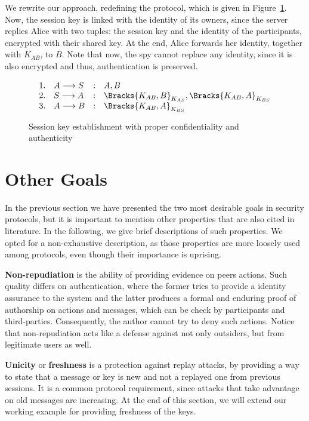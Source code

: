 We rewrite our approach, redefining the protocol, which is given in Figure~\ref{prt:session-key-auth}. Now, the session key is linked with the identity of its owners, since the server replies Alice with two tuples: the session key and the identity of the participants, encrypted with their shared key. At the end, Alice forwards her identity, together with $K_{AB}$, to $B$. Note that now, the spy cannot replace any identity, since it is also encrypted and thus, authentication is preserved.

\begin{figure}[ht]
  \centering
  \[
    \begin{array}{rlcl}
      1. & A \longrightarrow S &:& A, B \\
      2. & S \longrightarrow A &:& \Bracks{K_{AB}, B}_{K_{AS}}, \Bracks{K_{AB}, A}_{K_{BS}} \\
      3. & A \longrightarrow B &:& \Bracks{K_{AB}, A}_{K_{BS}} \\
    \end{array}
  \]
  \caption{Session key establishment with proper confidentiality and authenticity}
  \label{prt:session-key-auth}
\end{figure}





\section{Other Goals}
In the previous section we have presented the two most desirable goals in security protocols, but it is important to mention other properties that are also cited in literature. In the following, we give brief descriptions of such properties. We opted for a non-exhaustive description, as those properties are more loosely used among protocols, even though their importance is uprising.

\textbf{Non-repudiation} is the ability of providing evidence on peers actions. Such quality differs on authentication, where the former tries to provide a identity assurance to the system and the latter produces a formal and enduring proof of authorship on actions and messages, which can be check by participants and third-parties. Consequently, the author cannot try to deny such actions. Notice that non-repudiation acts like a defense against not only outsiders, but from legitimate users as well.

\textbf{Unicity} or \textbf{freshness} is a protection against replay attacks, by providing a way to state that a message or key is new and not a replayed one from previous sessions. It is a common protocol requirement, since attacks that take advantage on old messages are increasing. At the end of this section, we will extend our working example for providing freshness of the keys.

